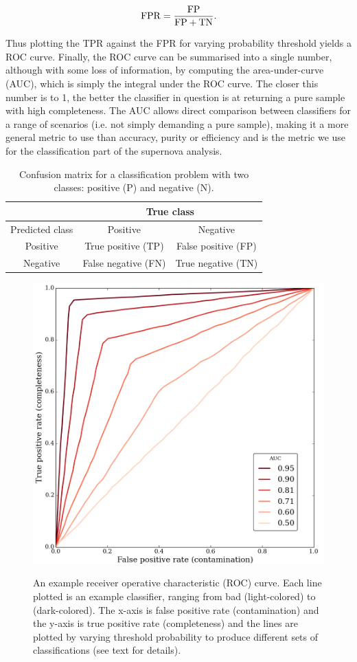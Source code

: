 \begin{equation}
 \rm{FPR} = \frac{\rm{FP}}{\rm{FP}+\rm{TN}}.
\end{equation}

Thus plotting the TPR against the FPR for varying probability threshold yields a ROC curve. 
Finally, the ROC curve can be summarised into a single number, although with some loss of 
information, by computing the area-under-curve (AUC), which is simply the integral under the ROC 
curve. The closer this number is to 1, the better the classifier in question is at returning a 
pure sample with high completeness. The AUC allows direct comparison between classifiers for a 
range of scenarios (i.e. not simply demanding a pure sample), making it a more general metric to 
use than accuracy, purity or efficiency and is the metric we use for the classification part of the 
supernova analysis.

\begin{table}
\centering
 \begin{tabular}{|c|c|c|}
 \hline
  & \multicolumn{2}{|c|}{True class}\\
  \hline
  Predicted class & Positive & Negative\\
  \hline
  Positive & True positive (TP) & False positive (FP)\\ 
  \hline
  Negative & False negative (FN) & True negative (TN)\\
  \hline
 \end{tabular}

 \label{table:confusion}
 \caption{Confusion matrix for a classification problem with two classes: positive (P) and negative 
(N).}
\end{table}


\begin{figure}
 \centering
 \includegraphics[width=0.7\hsize]{figs/supernova/roc_illustration}
 \label{fig:roc}
 \caption{An example receiver operative characteristic (ROC) curve. Each line plotted is an example 
classifier, ranging from bad (light-colored) to (dark-colored). The x-axis is false positive rate 
(contamination) and the y-axis is true positive rate (completeness) and the lines are plotted by 
varying threshold probability to produce different sets of classifications (see text for details).}
\end{figure}


